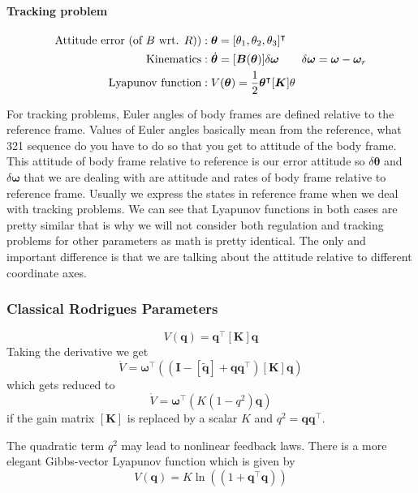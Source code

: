 \documentclass{article}
\begin{document}
\paragraph{Tracking problem}
\begin{equation*}
  \begin{split}
    \textnormal{Attitude error (of $B$ wrt. $R$))}&:\bm{\theta}=[\theta_{1},\theta_{2},\theta_{3}]^{\intercal}\\
    \textnormal{Kinematics}&:\dot{\bm{\theta}}=[\bm{B}(\bm{\theta})]\delta\bm{\omega}\quad\quad\delta\bm{\omega}=\bm{\omega}-\bm{\omega}_{r}\\
    \textnormal{Lyapunov function}&:V(\bm{\theta})=\frac{1}{2}\bm{\theta}^{\intercal}[\bm{K}]\theta\\
  \end{split}
\end{equation*}

For tracking problems, Euler angles of body frames are defined relative to the reference frame. Values of Euler angles basically mean from the reference, what 321 sequence do you have to do so that you get to attitude of the body frame. This attitude of body frame relative to reference is our error attitude so $\delta\bm{\theta}$ and $\delta\bm{\omega}$ that we are dealing with are attitude and rates of body frame relative to reference frame. Usually we express the states in reference frame when we deal with tracking problems. We can see that Lyapunov functions in both cases are pretty similar that is why we will not consider both regulation and tracking problems for other parameters as math is pretty identical. The only and important difference is that we are talking about the attitude relative to different coordinate axes.

\subsubsection{Classical Rodrigues Parameters}
$$
V(\bm{q})=\bm{q}^{\intercal}[\bm{K}]\bm{q}
$$
Taking the derivative we get
$$
\dot{V}=\bm{\omega}^{\intercal}((\bm{I}-[\tilde{\bm{q}}]+\bm{q}\bm{q}^{\intercal})[\bm{K}]\bm{q})
$$
which gets reduced to 
$$
\dot{V}=\bm{\omega}^{\intercal}(K(1-q^{2})\bm{q})
$$
if the gain matrix $[\bm{K}]$ is replaced by a scalar $K$ and $q^{2}=\bm{q}\bm{q}^{\intercal}$.

The quadratic term $q^{2}$ may lead to nonlinear feedback laws. There is a more elegant Gibbs-vector Lyapunov function which is given by
$$
V(\bm{q})=K\ln((1+\bm{q}^{\intercal}\bm{q}))
$$
\end{document}
